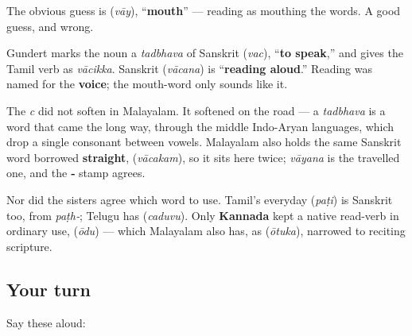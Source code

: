 \begin{cousinweb}
The obvious guess is \textbf{} (\emph{vāy}), \textquotedblleft{}\textbf{mouth}\textquotedblright{} — reading as mouthing the words. A good guess, and wrong.

Gundert marks the noun \textbf{} a \emph{tadbhava} of Sanskrit \textbf{} (\emph{vac}), \textquotedblleft{}\textbf{to speak},\textquotedblright{} and gives the Tamil verb as \emph{vācikka}. Sanskrit \textbf{} (\emph{vācana}) is \textquotedblleft{}\textbf{reading aloud}.\textquotedblright{} Reading was named for the \textbf{voice}; the mouth-word only sounds like it.

The \emph{c} did not soften in Malayalam. It softened on the road — a \emph{tadbhava} is a word that came the long way, through the middle Indo-Aryan languages, which drop a single consonant between vowels. Malayalam also holds the same Sanskrit word borrowed \textbf{straight}, \textbf{} (\emph{vācakam}), so it sits here twice; \emph{vāyana} is the travelled one, and the \textbf{‑} stamp agrees.

Nor did the sisters agree which word to use. Tamil's everyday \textbf{} (\emph{paṭi}) is Sanskrit too, from \emph{paṭh‑}; Telugu has \textbf{} (\emph{caduvu}). Only \textbf{Kannada} kept a native read-verb in ordinary use, \textbf{} (\emph{ōdu}) — which Malayalam also has, as \textbf{} (\emph{ōtuka}), narrowed to reciting scripture.
\end{cousinweb}

\subsection*{Your turn}
Say these aloud:

